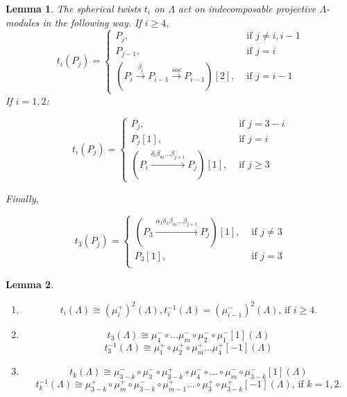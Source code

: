 \documentclass[10pt,a4paper]{amsart}
\newtheorem{lemma}{Lemma}
\begin{document}
\begin{lemma}\label{thm:twonLambda} The spherical twists $t_i$ on $\Lambda$ act on indecomposable projective $\Lambda$-modules in the following way. If $i \geq 4$, 
$$t_i(P_j) =
\begin{cases}
P_j, &\text{ if } j \neq i, i-1\\
P_{j-1},  &\text{ if } j=i\\
(P_i \xrightarrow{\beta_i} P_{i-1} \xrightarrow{soc} P_{i-1})[2],  &\text{ if } j = i-1
\end{cases}
$$ 
If $i=1,2$:

$$
t_i(P_j) =
\begin{cases}
P_j, & \text{ if } j = 3-i\\
P_j[1], & \text{ if } j=i\\
(P_i \xrightarrow{\delta_i\beta_m \dots \beta_{j+1}} P_j)[1], & \text{ if } j \geq 3
\end{cases}
$$ 

Finally, 

$$
t_3(P_j) =
\begin{cases}
(P_3 \xrightarrow{\alpha_1\delta_1\beta_m \dots \beta_{j+1}} P_j)[1], & \text{ if } j \neq 3\\
P_3[1], &\text{ if }  j=3\\
\end{cases}
$$ \end{lemma} 

 \begin{lemma}\label{thm:twviamut}  \begin{enumerate}
     \item  
     $$t_i(\Lambda) \cong (\mu_i^+)^2(\Lambda), t_i^{-1}(\Lambda) = (\mu_{i-1}^-)^2(\Lambda), \, \text{if } i \geq 4.$$
      \item  $$t_3(\Lambda) \cong  \mu_4^- \circ \dots \mu_m^- \circ \mu_2^- \circ \mu_1^-[1](\Lambda)$$
$${t_3^{-1}(\Lambda) \cong  \mu_1^+ \circ  \mu_2^+ \circ \mu_m^+ \dots \mu_4^+ [-1](\Lambda)}$$
     \item $$t_k(\Lambda) \cong  \mu_{3-k}^- \circ \mu_{3}^- \circ \mu_{3-k}^+ \circ \mu_4^- \circ \dots \circ \mu_m^- \circ \mu_{3-k}^-[1](\Lambda)$$ $${t_k^{-1}(\Lambda) \cong  \mu_{3-k}^+ \circ \mu_m^+ \circ  \mu_{3-k}^- \circ \mu_{m-1}^+ \dots \circ \mu_3^+ \circ \mu_{3-k}^+[-1](\Lambda)}, \, \text{if } k = 1,2.$$
    
 \end{enumerate} \end{lemma}
\end{document}
